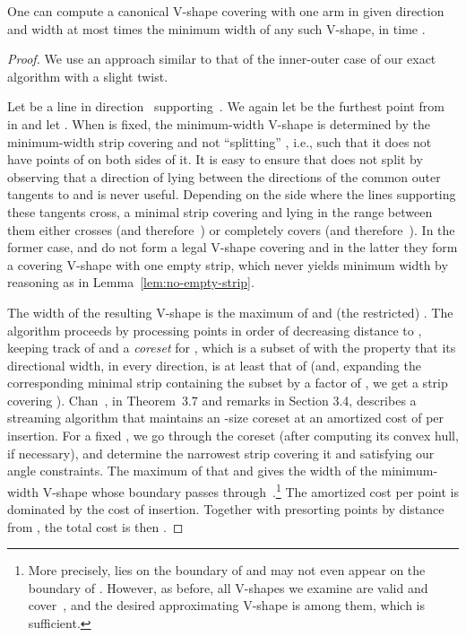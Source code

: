 \documentclass{llncs}
\begin{document}
\begin{lemma}
  \label{lem:apx-one-direction}
  One can compute a canonical V-shape  covering  with one arm in
  given direction  and width at most  times the
  minimum width of any such V-shape, in time .
\end{lemma}

\begin{proof}
  We use an approach similar to that of the inner-outer case of our
  exact algorithm with a slight twist.  


  Let  be a line in direction~ supporting~.  We
  again let  be the furthest point from  in 
  and let .  When  is fixed, the minimum-width
  V-shape is determined by the minimum-width strip  covering 
  and not ``splitting'' , i.e., such that it does not have points of
   on both sides of it.  It is easy to ensure that  does not
  split  by observing that a direction of  lying between the
  directions of the common outer tangents to  and  is
  never useful.  Depending on the side where the lines supporting
  these tangents cross, a minimal strip  covering  and lying
  in the range between them either crosses  (and therefore~) or
  completely covers  (and therefore~).  In the former case,
   and  do not form a legal V-shape covering  and in the
  latter they form a covering V-shape with one empty strip, which 
never yields minimum width by reasoning as in Lemma~\ref{lem:no-empty-strip}. 


  The width of the resulting V-shape is the maximum of 
  and (the restricted) .  The algorithm proceeds by processing points 
  in order of decreasing distance to , keeping track of
   and a \emph{coreset} for , which is a subset of
   with the property that its directional width, in every
  direction, is at least  that of  (and, expanding the
  corresponding minimal strip containing the subset by
  a factor of , we get a strip covering ).  Chan~\cite{chan04}, in
  Theorem~3.7 and remarks in Section 3.4, describes a streaming
  algorithm that maintains an -size coreset at an
  amortized cost of  per insertion.
  For a fixed , we go through the coreset (after computing its
  convex hull, if necessary), and determine the narrowest strip
  covering it and satisfying our angle constraints.  The maximum of
  that and  gives the width of the minimum-width
  V-shape whose boundary passes through~.\footnote{More precisely,  lies on the boundary of  and may not even appear
    on the boundary of . However, as before, all V-shapes we
    examine are valid and cover~, and the desired approximating
    V-shape is among them, which is sufficient.}
  The amortized cost per
  point is dominated by the  cost of
  insertion.  Together with presorting points by distance from ,
  the total cost is then . \hfill 
\end{proof}
\end{document}
